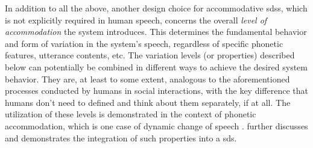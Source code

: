 In addition to all the above, another design choice for accommodative \acp{sds}, which is not explicitly required in human speech, concerns the overall \emph{level of accommodation} the system introduces.
This determines the fundamental behavior and form of variation in the system's speech, regardless of specific phonetic features, utterance contents, etc.
The variation levels (or properties) described below can potentially be combined in different ways to achieve the desired system behavior.
They are, at least to some extent, analogous to the aforementioned processes conducted by humans in social interactions, with the key difference that humans don't need to defined and think about them separately, if at all.
The utilization of these levels is demonstrated in the context of phonetic accommodation, which is one case of dynamic change of speech \citep{Weise2019individual, Schweitzer2016exemplar, Bevnuvs2014social}.
 further discusses and demonstrates the integration of such properties into a \ac{sds}.

